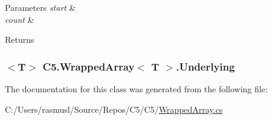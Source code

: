 \begin{DoxyParams}{Parameters}
{\em start} & \\
\hline
{\em count} & \\
\hline
\end{DoxyParams}
\begin{DoxyReturn}{Returns}

\end{DoxyReturn}
\hypertarget{class_c5_1_1_wrapped_array_a696f786dd743babd7c4978785b2650d3}{}
\subsubsection[{Underlying}]{$<$T$>$ {\bf C5.\+Wrapped\+Array}$<$ T $>$.Underlying\hspace{0.3cm}{\ttfamily [get]}}\label{class_c5_1_1_wrapped_array_a696f786dd743babd7c4978785b2650d3}






The documentation for this class was generated from the following file\+:\begin{DoxyCompactItemize}
\item 
C\+:/\+Users/rasmusl/\+Source/\+Repos/\+C5/\+C5/\hyperlink{_wrapped_array_8cs}{Wrapped\+Array.\+cs}\end{DoxyCompactItemize}
